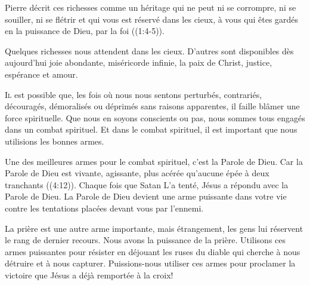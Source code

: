 Pierre décrit ces richesses comme \Og un héritage qui ne peut ni se corrompre,
 ni se souiller, ni se flétrir et qui vous est réservé dans les cieux,
 à vous qui êtes gardés en la puissance de Dieu, par la foi \Fg{}
 ((1:4-5)). 

Quelques richesses nous attendent dans les cieux.
 D'autres sont disponibles dès aujourd'hui\frcolon{}
 joie abondante, miséricorde infinie, la paix de Christ,
 justice, espérance et amour.

\dvrule







\lettrine{I}{l} est possible que,
 les fois où nous nous sentons perturbés, contrariés, découragés,
 démoralisés ou déprimés sans raisons apparentes, il faille blâmer
 une force spirituelle.
 Que nous en soyons conscients ou pas, nous sommes tous engagés
 dans un combat spirituel. Et dans le combat spirituel,
 il est important que nous utilisions les bonnes armes.

Une des meilleures armes pour le combat spirituel, c'est la Parole de Dieu.
 \Og Car la Parole de Dieu est vivante, agissante, plus acérée
 qu'aucune épée à deux tranchants \Fg{} ((4:12)).
 Chaque fois que Satan L'a tenté, Jésus a répondu avec la Parole de Dieu.
 La Parole de Dieu devient une arme puissante dans votre vie
 contre les tentations placées devant vous par l'ennemi.


La prière est une autre arme importante, mais étrangement,
 les gens lui réservent le rang de dernier recours.
 Nous avons la puissance de la prière. Utilisons ces armes puissantes
 pour résister en déjouant les ruses du diable qui cherche à nous détruire
 et à nous capturer.
 Puissions-nous utiliser ces armes pour proclamer la victoire
 que Jésus a déjà remportée à la croix!

